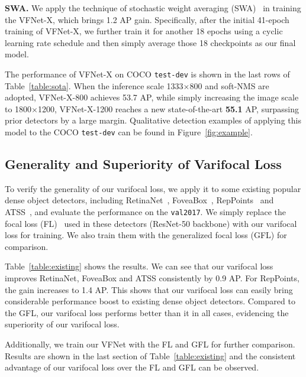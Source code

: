 \noindent \textbf{SWA.} We apply the technique of stochastic weight averaging (SWA)~\cite{SWA} in training the VFNet-X, which brings 1.2 AP gain. Specifically, after the initial 41-epoch training of VFNet-X, we further train it for another 18 epochs using a cyclic learning rate schedule and then simply average those 18 checkpoints as our final model.


The performance of VFNet-X on COCO \texttt{test-dev} is shown in the last rows of Table~\ref{table:sota}. When the inference scale 1333$\times$800 and soft-NMS\cite{SoftNMS} are adopted, VFNet-X-800 achieves 53.7 AP, while simply increasing the image scale to 1800$\times$1200, VFNet-X-1200 reaches a new state-of-the-art \textbf{55.1} AP, surpassing prior detectors by a large margin. 
 Qualitative detection examples of applying this model to the COCO \texttt{test-dev} can be found in Figure~\ref{fig:example}.



\vspace{-0.5mm}
\subsection{Generality and Superiority of Varifocal Loss}
\vspace{-0.5mm}
To verify the generality of our varifocal loss, we apply it to some existing popular dense object detectors, including RetinaNet~\cite{retinaNet}, FoveaBox~\cite{foveaBox}, RepPoints~\cite{repPoints} and ATSS~\cite{ATSS}, and evaluate the performance on the \texttt{val2017}. We simply replace the focal loss (FL)~\cite{retinaNet} used in these detectors (ResNet-50 backbone) with our varifocal loss for training. We also train them with the generalized focal loss (GFL) for comparison. 

Table~\ref{table:existing} shows the results.
We can see that our varifocal loss improves RetinaNet, FoveaBox and ATSS consistently by 0.9 AP. For RepPoints, the gain increases to 1.4 AP. This shows that our varifocal loss can easily bring considerable performance boost to existing dense object detectors. Compared to the GFL, our varifocal loss performs better than it in all cases, evidencing the superiority of our varifocal loss. 

Additionally, we train our VFNet with the FL and GFL for further comparison. Results are shown in the last section of Table~\ref{table:existing} and the consistent advantage of our varifocal loss over the FL and GFL can be observed.

